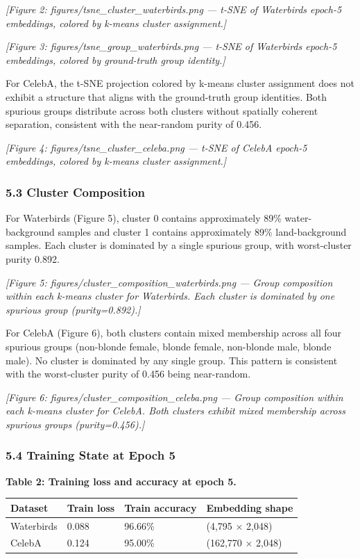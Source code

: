 \textit{[Figure 2: figures/tsne_cluster_waterbirds.png — t-SNE of Waterbirds epoch-5 embeddings, colored by k-means cluster assignment.]}

\textit{[Figure 3: figures/tsne_group_waterbirds.png — t-SNE of Waterbirds epoch-5 embeddings, colored by ground-truth group identity.]}

For CelebA, the t-SNE projection colored by k-means cluster assignment does not exhibit a structure that aligns with the ground-truth group identities. Both spurious groups distribute across both clusters without spatially coherent separation, consistent with the near-random purity of 0.456.

\textit{[Figure 4: figures/tsne_cluster_celeba.png — t-SNE of CelebA epoch-5 embeddings, colored by k-means cluster assignment.]}

\subsubsection{5.3 Cluster Composition}

For Waterbirds (Figure 5), cluster 0 contains approximately 89\% water-background samples and cluster 1 contains approximately 89\% land-background samples. Each cluster is dominated by a single spurious group, with worst-cluster purity 0.892.

\textit{[Figure 5: figures/cluster_composition_waterbirds.png — Group composition within each k-means cluster for Waterbirds. Each cluster is dominated by one spurious group (purity=0.892).]}

For CelebA (Figure 6), both clusters contain mixed membership across all four spurious groups (non-blonde female, blonde female, non-blonde male, blonde male). No cluster is dominated by any single group. This pattern is consistent with the worst-cluster purity of 0.456 being near-random.

\textit{[Figure 6: figures/cluster_composition_celeba.png — Group composition within each k-means cluster for CelebA. Both clusters exhibit mixed membership across spurious groups (purity=0.456).]}

\subsubsection{5.4 Training State at Epoch 5}

\textbf{Table 2: Training loss and accuracy at epoch 5.}

\begin{table}[htbp]
\centering
\begin{tabular}{llll}
\toprule
Dataset & Train loss & Train accuracy & Embedding shape \\
\midrule
Waterbirds & 0.088 & 96.66\% & (4,795 × 2,048) \\
CelebA & 0.124 & 95.00\% & (162,770 × 2,048) \\
\bottomrule
\end{tabular}
\end{table}

